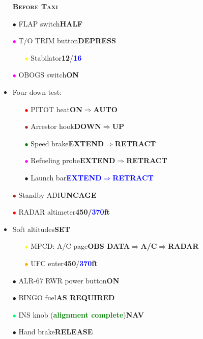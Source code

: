 \documentclass[a4paper,12pt,dvipsnames]{letter}
\newcommand{\button}[1]{\textbf{#1}}
\newcommand{\ok}[1]{\textcolor{Green}{\textbf{#1}}}
\newcommand{\boat}[1]{\textcolor{Blue}{\textbf{#1}}}
\newcommand{\myHead}[1]{{\LARGE\textsc{\textbf{#1}}}}
\newcommand{\bi}{\textcolor{ProcessBlue}{$\bullet$\;}}
\newcommand{\ri}{\textcolor{Red}{$\bullet$\;}}
\newcommand{\gi}{\textcolor{Green}{$\bullet$\;}}
\newcommand{\yi}{\textcolor{Yellow}{$\bullet$\;}}
\newcommand{\mi}{\textcolor{Magenta}{$\bullet$\;}}
\newcommand{\oi}{\textcolor{Orange}{$\bullet$\;}}
\newcommand{\ai}{\textcolor{Apricot}{$\bullet$\;}}
\renewcommand{\ni}{\textcolor{Brown}{$\bullet$\;}}
\newcommand{\si}{\textcolor{SpringGreen}{$\bullet$\;}}
\begin{document}
{\begin{itemize}
\begin{itemize}
 \end{itemize}
\end{itemize} 
\newpage
\begin{itemize}
 \item[] \myHead{Before Taxi}
 \item[\bi] FLAP switch\dotfill\button{HALF}
 \item[\mi] T/O TRIM button\dotfill\button{DEPRESS}
 \begin{itemize}
  \item[\yi] Stabilator\dotfill\button{12\textdegree}/\boat{16\textdegree}
 \end{itemize}
 \item[\mi] OBOGS switch\dotfill\button{ON}
 \item Four down test:
 \begin{itemize}
  \item[\ri] PITOT heat\dotfill\button{ON\;$\Rightarrow$\;AUTO}
  \item[\ni] Arrestor hook\dotfill\button{DOWN\;$\Rightarrow$\;UP}
  \item[\gi] Speed brake\dotfill\button{EXTEND\;$\Rightarrow$\;RETRACT}
  \item[\mi] Refueling probe\dotfill\button{EXTEND\;$\Rightarrow$\;RETRACT}
  \item[\bi] Launch bar\dotfill\boat{EXTEND\;$\Rightarrow$\;RETRACT}
 \end{itemize}
 \item[\ni] Standby ADI\dotfill\button{UNCAGE}
 \item[\ri] RADAR altimeter\dotfill\button{450/\boat{370}\;ft}
 \item Soft altitudes\dotfill\button{SET}
 \begin{itemize}
  \item[\yi] MPCD: A/C page\dotfill\button{OBS DATA\;$\Rightarrow$\;A/C\;$\Rightarrow$\;RADAR}
  \item[\oi] UFC enter\dotfill\button{450}/\boat{370}\button{\;ft}
 \end{itemize}
 \item[\ai] ALR-67 RWR power button\dotfill\button{ON}
 \item[\bi] BINGO fuel\dotfill\button{AS REQUIRED}
 \item[\si] INS knob (\ok{alignment complete})\dotfill\button{NAV}
 \item[\bi] Hand brake\dotfill\button{RELEASE}

\end{itemize}}
\end{document}
